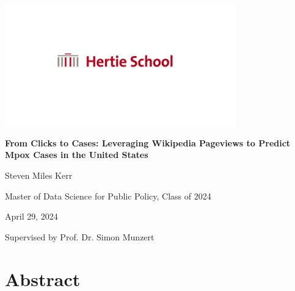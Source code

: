 \documentclass[
  12pt,
]{article}
\author{Steven Miles Kerr}
\date{29 April 2024}
\begin{document}
\begin{titlepage}
    \centering
    \includegraphics[width=0.75\textwidth]{images/hertie-school-logo.jpg}
    \vspace*{\fill}
    
    \textbf{From Clicks to Cases: Leveraging Wikipedia Pageviews to Predict Mpox Cases in the United States}

    \vspace{2.5cm}

    Steven Miles Kerr

    \vspace{1cm}
    
    Master of Data Science for Public Policy, Class of 2024\\
    
    \vspace{0.5cm}

    April 29, 2024\\

    \vspace*{\fill}

    Supervised by Prof. Dr. Simon Munzert

\end{titlepage}

\tableofcontents
\thispagestyle{empty}
\newpage

\setcounter{page}{1}

\section{Abstract}\label{abstract}
\end{document}

